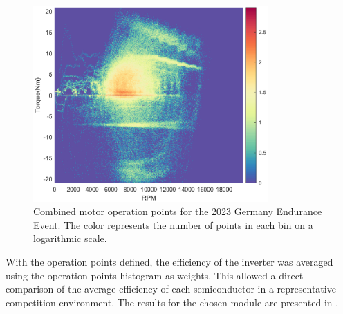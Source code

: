\begin{figure}[H]
	\centering
	\includegraphics[width=0.8\textwidth]{Figures/Endurance_FSG_combined.eps}
	\caption{Combined motor operation points for the 2023 Germany Endurance Event. The color represents the number of points in each bin on a logarithmic scale.}
	\label{fig:motor_operation_points_combined}
\end{figure}

With the operation points defined, the efficiency of the inverter was averaged using the operation points histogram as weights. This allowed a direct comparison of the average efficiency of each semiconductor in a representative competition environment. The results for the chosen module are presented in .

